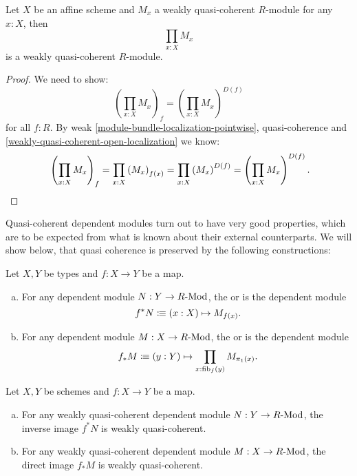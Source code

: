 \begin{lemma}%
  \label{weakly-quasi-coherent-pi}
  Let $X$ be an affine scheme and $M_x$ a weakly quasi-coherent $R$-module for any $x:X$,
  then
  \[
    \prod_{x:X}M_x
  \]
  is a weakly quasi-coherent $R$-module.
\end{lemma}

\begin{proof}
  We need to show:
  \[
    \left(\prod_{x:X}M_x\right)_f=\left(\prod_{x:X}M_x\right)^{D(f)}
  \]
  for all $f:R$.
  By weak \cref{module-bundle-localization-pointwise}, quasi-coherence
  and \cref{weakly-quasi-coherent-open-localization}
  we know:
  \[
    \left(\prod_{x:X}M_x\right)_f
    =\prod_{x:X}\left(M_x\right)_{f(x)}
    =\prod_{x:X}\left(M_x\right)^{D(f)}
    =\left(\prod_{x:X}M_x\right)^{D(f)}
    \rlap{.}
  \]
\end{proof}

Quasi-coherent dependent modules turn out to have very good properties,
which are to be expected from what is known about their external counterparts.
We will show below, that quasi coherence is preserved by the following constructions:

\begin{definition}
  \label{pullback-push-forward}
  Let $X,Y$ be types and $f:X\to Y$ be a map.
  \begin{enumerate}[(a)]
  \item {} For any dependent module $N:Y\to R\text{-}\mathrm{Mod}$,
    the  or  is the dependent module
    \[
      f^*N\colonequiv (x:X) \mapsto M_{f(x)}\rlap{.}
    \]
  \item {} For any dependent module $M:X\to R\text{-}\mathrm{Mod}$,
    the  or  is the dependent module
    \[
      f_*M\colonequiv (y:Y) \mapsto \prod_{x:\fib_f(y)}M_{\pi_1(x)}\rlap{.}
    \]
  \end{enumerate}
\end{definition}

\begin{theorem}%
  \label{pullback-push-forward-qcoh}
  Let $X,Y$ be schemes and $f:X\to Y$ be a map.
  \begin{enumerate}[(a)]
  \item For any weakly quasi-coherent dependent module $N:Y\to R\text{-}\mathrm{Mod}$,
    the inverse image $f^*N$ is weakly quasi-coherent.
  \item For any weakly quasi-coherent dependent module $M:X\to R\text{-}\mathrm{Mod}$,
    the direct image $f_*M$ is weakly quasi-coherent.
  \end{enumerate}
\end{theorem}

